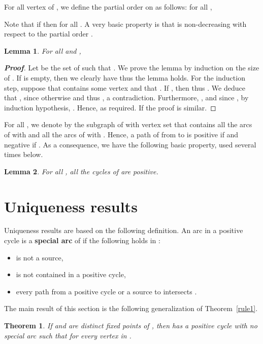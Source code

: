 \documentclass[11pt,a4paper]{article}
\newtheorem{lemma}{Lemma}
\newtheorem{theorem}{Theorem}
\begin{document}
\medskip
For all vertex  of , we define the partial order  on  as follows: for all , 

Note that if  then  for all . A very basic property is that  is non-decreasing with respect to the partial order . 

\begin{lemma}\label{local_lemma}
For all  and ,

\end{lemma}


\begin{proof}[{\bf Proof}]
Let  be the set of  such that . We prove the lemma by induction on the size of . If  is empty, then we clearly have  thus the lemma holds. For the induction step, suppose that  contains some vertex  and that . If , then  thus . We deduce that , since otherwise  and thus , a contradiction. Furthermore, , and since , by induction hypothesis, . Hence,  as required. If  the proof is similar.
\end{proof}

For all , we denote by  the subgraph of  with vertex set  that contains all the  arcs  of  with  and all the arcs  of  with . Hence, a path of  from  to  is positive if  and negative if . As a consequence, we have the following basic property, used several times below.

\begin{lemma}
For all , all the cycles of  are positive.
\end{lemma}

\section{Uniqueness results}\label{sec:uniqueness}


Uniqueness results are based on the following definition. An arc  in a positive cycle  is a {\bf special arc} of  if the following holds in  :
\begin{itemize}
\item[]  is not a source,
\item[]  is not contained in a positive cycle,
\item[] every path from a positive cycle or a source to  intersects .
\end{itemize} 

The main result of this section is the following generalization of Theorem~\ref{rule1}. 

\begin{theorem}\label{uniqueness}
If  and  are distinct fixed points of , then  has a positive cycle  with no special arc such that  for every vertex  in . 
\end{theorem}
\end{document}
